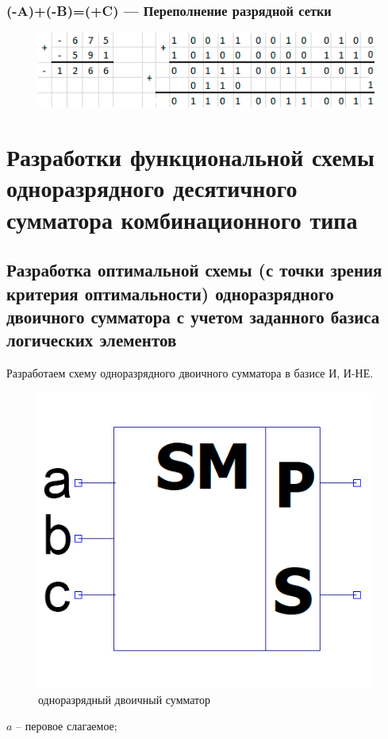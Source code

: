 \documentclass[a4paper,14pt]{article}
\begin{document}
\subsubsection{(-A)+(-B)=(+C) — Переполнение разрядной сетки}


\begin{figure}[H]
	\centering
	\includegraphics[width=0.7\linewidth]{primeri/pr_6_2}
	\caption{}
	\label{fig:screenshot006}
\end{figure}

\section{Разработки функциональной схемы одноразрядного десятичного сумматора комбинационного типа}

\subsection{Разработка оптимальной схемы (с точки зрения критерия оптимальности) одноразрядного двоичного сумматора с учетом заданного базиса логических элементов}

Разработаем схему одноразрядного двоичного сумматора в базисе И, И-НЕ.

\begin{figure}[H]
	\centering
	\includegraphics[width=0.4\linewidth]{images/dvSum_el}
	\caption{одноразрядный двоичный сумматор}
	\label{fig:dvSum_el}
\end{figure}

$a$ -- перовое слагаемое;
\end{document}
